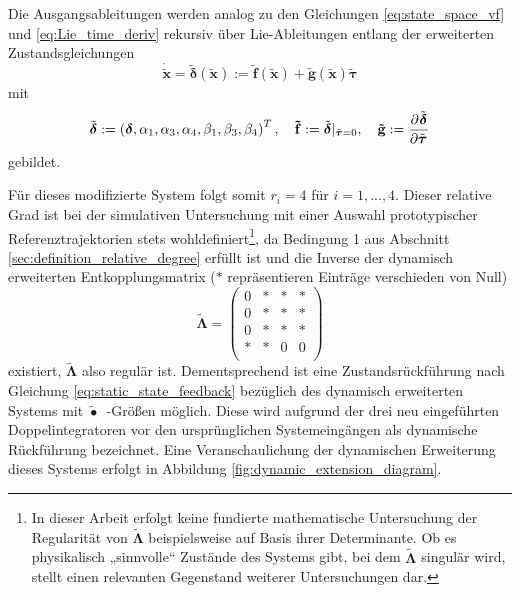 Die Ausgangsableitungen werden analog zu den Gleichungen \eqref{eq:state_space_vf} und \eqref{eq:Lie_time_deriv} rekursiv über Lie-Ableitungen entlang der erweiterten Zustandsgleichungen 
\begin{equation}
	\dot{\tilde{\mathbf{x}}} = \tilde{\boldsymbol{\delta}}(\tilde{\mathbf{x}}) := \mathbf{\tilde{f}}(\tilde{\mathbf{x}}) + \mathbf{\tilde{g}}(\tilde{\mathbf{x}}) \tilde{\boldsymbol{\tau}}
\end{equation}
mit
\begin{align}
	\tilde{\boldsymbol{\delta}} :=
	\left(\boldsymbol{\delta},
		\alpha_1,
		\alpha_3,
		\alpha_4,
		\beta_1,
		\beta_3,
		\beta_4 \right)^T, \quad
	\mathbf{\tilde{f}} := \tilde{\boldsymbol{\delta}}|_{\tilde{\boldsymbol{\tau}} = 0}, \quad
	\mathbf{\tilde{g}} := \frac{\partial^{}\tilde{\boldsymbol{\delta}}}{\partial{\tilde{\boldsymbol{\tau}}}^{}}
\end{align}
gebildet.

Für dieses modifizierte System folgt somit $r_i = 4$ für $i = 1, ..., 4$. Dieser relative Grad ist bei der simulativen Untersuchung mit einer Auswahl prototypischer Referenztrajektorien stets wohldefiniert\footnote{In dieser Arbeit erfolgt keine fundierte mathematische Untersuchung der Regularität von $\tilde{\boldsymbol{\Lambda}}$ beispielsweise auf Basis ihrer Determinante. Ob es physikalisch „sinnvolle“ Zustände des Systems gibt, bei dem $\tilde{\boldsymbol{\Lambda}}$ singulär wird, stellt einen relevanten Gegenstand weiterer Untersuchungen dar.}, da Bedingung 1 aus Abschnitt \ref{sec:definition_relative_degree} erfüllt ist und die Inverse der dynamisch erweiterten Entkopplungsmatrix ($*$ repräsentieren Einträge verschieden von Null)
\begin{equation}
	\tilde{\boldsymbol{\Lambda}} =
	\left(\begin{matrix}
		0 & * & * & * \\
		0 & * & * & * \\
		0 & * & * & * \\
		* & * & 0 & 0 \\
	\end{matrix}\right)
\end{equation}
existiert, $\tilde{\boldsymbol{\Lambda}}$ also regulär ist. Dementsprechend ist eine Zustandsrückführung nach Gleichung \eqref{eq:static_state_feedback} bezüglich des dynamisch erweiterten Systems mit $\tilde{\bullet}$~-Größen möglich. Diese wird aufgrund der drei neu eingeführten Doppelintegratoren vor den ursprünglichen Systemeingängen als dynamische Rückführung bezeichnet. Eine Veranschaulichung der dynamischen Erweiterung dieses Systems erfolgt in Abbildung \ref{fig:dynamic_extension_diagram}.

